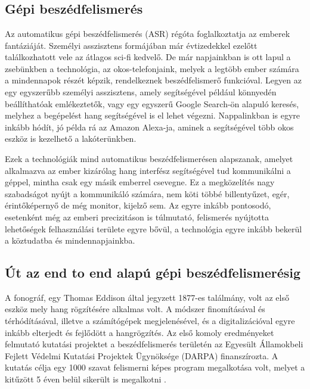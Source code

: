 \chapter{\bevezetes}

\section{Gépi beszédfelismerés}

Az automatikus gépi beszédfelismerés (ASR) régóta foglalkoztatja az emberek fantáziáját. Személyi asszisztens formájában már évtizedekkel ezelőtt találkozhatott vele az átlagos sci-fi kedvelő. De már napjainkban is ott lapul a zsebünkben a technológia, az okos-telefonjaink, melyek a legtöbb ember számára a mindennapok részét képzik, rendelkeznek beszédfelismerő funkcióval. Legyen az egy egyszerűbb személyi asszisztens, amely segítségével például könnyedén beállíthatóak emlékeztetők, vagy egy egyszerű Google Search-ön alapuló keresés, melyhez a begépelést hang segítségével is el lehet végezni. Nappalinkban is egyre inkább hódít, jó példa rá az Amazon Alexa-ja, aminek a segítségével több okos eszköz is kezelhető a lakóterünkben.

Ezek a technológiák mind automatikus beszédfelismerésen alapszanak, amelyet alkalmazva az ember kizárólag hang interfész segítségével tud kommunikálni a géppel, mintha csak egy másik emberrel csevegne. Ez a megközelítés nagy szabadságot nyújt a kommunikáló számára, nem köti többé billentyűzet, egér, érintőképernyő de még monitor, kijelző sem. Az egyre inkább pontosodó, esetenként még az emberi precizitáson is túlmutató, felismerés nyújtotta lehetőségek felhasználási területe egyre bővül, a technológia egyre inkább bekerül a köztudatba és mindennapjainkba.

\section{Út az end to end alapú gépi beszédfelismerésig}

A fonográf, egy Thomas Eddison által jegyzett 1877-es találmány, volt az első eszköz mely hang rögzítésére alkalmas volt. A módszer finomításával és térhódításával,  illetve a számítógépek megjelenésével, és a digitalizációval egyre inkább elterjedt és fejlődött a hangrögzítés. Az első komoly eredményeket felmutató kutatási projektet a beszédfelismerés területén az Egyesült Államokbeli Fejlett Védelmi Kutatási Projektek Ügynöksége (DARPA) finanszírozta. A kutatás célja egy 1000 szavat felismerni képes program megalkotása volt, melyet a kitűzött 5 éven belül sikerült is megalkotni \cite{tortenelem}.

